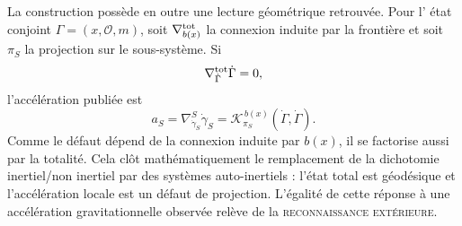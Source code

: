 La construction possède en outre une lecture géométrique retrouvée. Pour l'
état conjoint \(\Gamma=(x,\mathcal O,m)\), soit
\(\nabla^{\rm tot}_{b(x)}\) la connexion induite par la frontière et soit
\(\pi_S\) la projection sur le sous-système. Si
\[
 \nabla^{\rm tot}_{\dot\Gamma}\dot\Gamma=0,
\]
l'accélération publiée est
\[
 a_S
 =\nabla^S_{\dot\gamma_S}\dot\gamma_S
 =\mathcal K_{\pi_S}^{\,b(x)}(\dot\Gamma,\dot\Gamma).
\]
Comme le défaut dépend de la connexion induite par \(b(x)\), il se
factorise aussi par la totalité. Cela clôt mathématiquement le remplacement de la
dichotomie inertiel/non inertiel par des systèmes auto-inertiels : l'état total
est géodésique et l'accélération locale est un défaut de projection. L'égalité de
cette réponse à une accélération gravitationnelle observée relève de la
\textsc{reconnaissance extérieure}.

